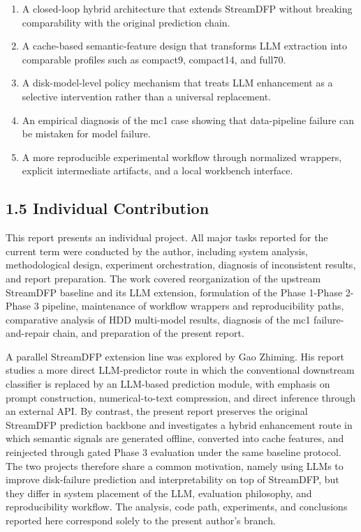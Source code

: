 \documentclass[
  11pt,
  a4paper]{article}
\providecommand{\tightlist}{%
  \setlength{\itemsep}{0pt}\setlength{\parskip}{0pt}}
\begin{document}
\begin{enumerate}
\def\labelenumi{\arabic{enumi}.}
\tightlist
\item
  A closed-loop hybrid architecture that extends StreamDFP without
  breaking comparability with the original prediction chain.
\item
  A cache-based semantic-feature design that transforms LLM extraction
  into comparable profiles such as compact9, compact14, and full70.
\item
  A disk-model-level policy mechanism that treats LLM enhancement as a
  selective intervention rather than a universal replacement.
\item
  An empirical diagnosis of the mc1 case showing that data-pipeline
  failure can be mistaken for model failure.
\item
  A more reproducible experimental workflow through normalized wrappers,
  explicit intermediate artifacts, and a local workbench interface.
\end{enumerate}

\hypertarget{individual-contribution}{%
\subsection{1.5 Individual Contribution}\label{individual-contribution}}

This report presents an individual project. All major tasks reported for
the current term were conducted by the author, including system
analysis, methodological design, experiment orchestration, diagnosis of
inconsistent results, and report preparation. The work covered
reorganization of the upstream StreamDFP baseline and its LLM extension,
formulation of the Phase 1-Phase 2-Phase 3 pipeline, maintenance of
workflow wrappers and reproducibility paths, comparative analysis of HDD
multi-model results, diagnosis of the mc1 failure-and-repair chain, and
preparation of the present report.

A parallel StreamDFP extension line was explored by Gao Zhiming. His
report studies a more direct LLM-predictor route in which the
conventional downstream classifier is replaced by an LLM-based
prediction module, with emphasis on prompt construction,
numerical-to-text compression, and direct inference through an external
API. By contrast, the present report preserves the original StreamDFP
prediction backbone and investigates a hybrid enhancement route in which
semantic signals are generated offline, converted into cache features,
and reinjected through gated Phase 3 evaluation under the same baseline
protocol. The two projects therefore share a common motivation, namely
using LLMs to improve disk-failure prediction and interpretability on
top of StreamDFP, but they differ in system placement of the LLM,
evaluation philosophy, and reproducibility workflow. The analysis, code
path, experiments, and conclusions reported here correspond solely to
the present author's branch.
\end{document}
